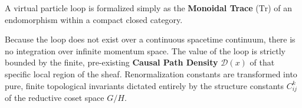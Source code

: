 \documentclass[12pt,letterpaper]{article}
\begin{document}
A virtual particle loop is formalized simply as the \textbf{Monoidal Trace} ($\text{Tr}$) of an endomorphism within a compact closed category.

Because the loop does not exist over a continuous spacetime continuum, there is no integration over infinite momentum space. The value of the loop is strictly bounded by the finite, pre-existing \textbf{Causal Path Density} $\mathcal{D}(x)$ of that specific local region of the sheaf. Renormalization constants are transformed into pure, finite topological invariants dictated entirely by the structure constants $C_{ij}^k$ of the reductive coset space $G/H$.
\end{document}
